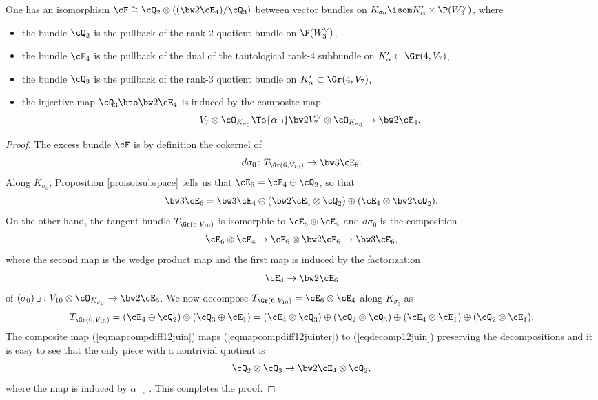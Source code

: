 \begin{prop}\label{proexcessalphabeta}
One has an isomorphism $\cF\cong \cQ_2\otimes((\bw2\cE_4)/\cQ_3)$ between vector bundles on $K_{\sigma_0}\isom K'_\alpha\times \P(W_3^\vee)$, where
\begin{itemize}
\item the bundle $\cQ_2$ is the pullback of
the rank-$2$ quotient bundle on $\P(W_3^\vee)$,
\item the bundle $\cE_4$ is the pullback of the dual of
the tautological rank-$4$ subbundle on $K'_\alpha\subset \Gr(4,V_7)$,
\item the bundle $\cQ_3$ is the pullback of
the rank-$3$ quotient bundle on $K'_\alpha\subset \Gr(4,V_7)$,
\item the injective map $\cQ_3\hto \bw2\cE_4$ is induced by the composite map
\[
V_7\otimes \cO_{K_{\sigma_0}}\To{\alpha\,\lrcorner} \bw2V_7^\vee\otimes \cO_{K_{\sigma_0}}\to \bw2\cE_4
.
\]
\end{itemize}
\end{prop}

\begin{proof} The excess bundle $\cF$ is by definition the cokernel of
\[
d\sigma_0\colon T_{\Gr(6,V_{10})}\to \bw3\cE_6.
\]
Along $K_{\sigma_0}$, Proposition \ref{proisotsubspace} tells us that
$\cE_6=\cE_4\oplus\cQ_2$, so that
\begin{equation}\label{eqdecomp12juin}
\bw3\cE_6=\bw3\cE_4\oplus
(\bw2\cE_4\otimes \cQ_2)\oplus (\cE_4\otimes \bw2\cQ_2).
\end{equation}
On the other hand, the tangent bundle $T_{\Gr(6,V_{10})}$ is isomorphic to
$\cE_6\otimes \cE_4$ and
$d\sigma_0$ is the composition
\begin{equation}\label{eqmapcompdiff12juin}
\cE_6\otimes \cE_4\to \cE_6\otimes \bw2\cE_6\to \bw3\cE_6,
\end{equation}
where the second map is the wedge product map and the first map is
induced by the factorization
\[
\cE_4\to \bw2\cE_6
\]
of $(\sigma_0)\,\lrcorner\,\colon V_{10}\otimes \cO_{K_{\sigma_0}}\to \bw2\cE_6$. We now decompose
$T_{\Gr(6,V_{10})}=\cE_6\otimes \cE_4$ along $K_{\sigma_0}$ as
\begin{equation}\label{eqmapcompdiff12juinter}
T_{\Gr(6,V_{10})}=(\cE_4\oplus \cQ_2)\otimes (\cQ_3\oplus \cE_1)
=(\cE_4\otimes \cQ_3)\oplus( \cQ_2\otimes \cQ_3)\oplus
(\cE_4\otimes\cE_1)\oplus (\cQ_2\otimes \cE_1).
\end{equation}
The composite map (\ref{eqmapcompdiff12juin}) maps (\ref{eqmapcompdiff12juinter}) to
(\ref{eqdecomp12juin}) preserving the decompositions and it is easy to see that the only piece with a nontrivial quotient is
\[
\cQ_2\otimes \cQ_3\to \bw2\cE_4\otimes \cQ_2,
\]
where the map is induced by $\alpha\,\lrcorner{}\,$. This completes the proof.
\end{proof}

